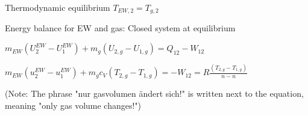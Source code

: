 Thermodynamic equilibrium \( T_{EW,2} = T_{g,2} \)  

Energy balance for EW and gas:  
Closed system at equilibrium  

\( m_{EW}(U_{2}^{EW} - U_{1}^{EW}) + m_g(U_{2,g} - U_{1,g}) = Q_{12} - W_{12} \)  

\( m_{EW}(u_{2}^{EW} - u_{1}^{EW}) + m_g c_V (T_{2,g} - T_{1,g}) = -W_{12} = R \frac{(T_{2,g} - T_{1,g})}{n - n} \)  

(Note: The phrase "nur gasvolumen ändert sich!" is written next to the equation, meaning "only gas volume changes!")